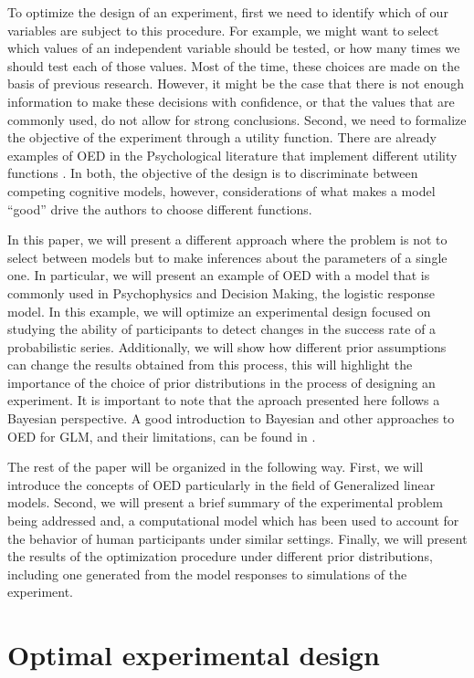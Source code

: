 \documentclass[preprint,review,12pt]{elsarticle}
\begin{document}
To optimize the design of an experiment, first we need to identify which of our variables are subject to this procedure. For example, we might want to select which values of an independent variable should be tested, or how many times we should test each of those values. Most of the time, these choices are made on the basis of previous research. However, it might be the case that there is not enough information to make these decisions with confidence, or that the values that are commonly used, do not allow for strong conclusions. Second, we need to formalize the objective of the experiment through a utility function. There are already examples of OED in the Psychological literature that implement different utility functions \citep[e.g.][]{Myung2009,ZL2010}. In both, the objective of the design is to discriminate between competing cognitive models, however, considerations of what makes a model ``good'' drive the authors to choose different functions.

In this paper, we will present a different approach where the problem is not to select between models but to make inferences about the parameters of a single one. In particular, we will present an example of OED with a model that is commonly used in Psychophysics and Decision Making, the logistic response model. %
In this example, we will optimize an experimental design focused on studying the ability of participants to detect changes in the success rate of a probabilistic series. Additionally, we will show how different prior assumptions can change the results obtained from this process, this will highlight the importance of the choice of prior distributions in the process of designing an experiment. It is important to note that the aproach presented here follows a Bayesian perspective. A good introduction to Bayesian and other approaches to OED for GLM, and their limitations, can be found in \citet{khurietal2006}.

The rest of the paper will be organized in the following way. First, we will introduce the concepts of OED particularly in the field of Generalized linear models. Second, we will present a brief summary of the experimental problem being addressed and, a computational model which has been used to account for the behavior of human participants under similar settings. Finally, we will present the results of the optimization procedure under different prior distributions, including one generated from the model responses to simulations of the experiment.

\section{Optimal experimental design}
\end{document}
